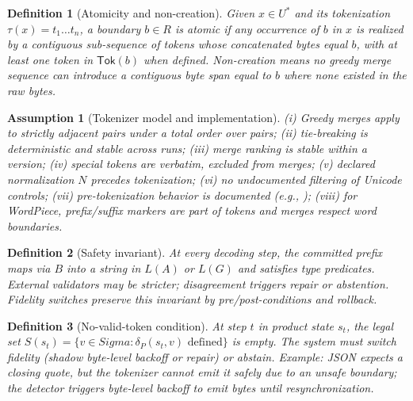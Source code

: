 \documentclass{article}
\def\Sigma{Sigma}%
\def\mathcal#1{#1}%
\newtheorem{assumption}{Assumption}
\newtheorem{definition}{Definition}
\begin{document}
\begin{definition}[Atomicity and non-creation]
Given $x\in\mathcal{U}^\ast$ and its tokenization $\tau(x)=t_1\dots t_n$, a boundary $b\in\mathcal{R}$ is atomic if any occurrence of $b$ in $x$ is realized by a contiguous sub-sequence of tokens whose concatenated bytes equal $b$, with at least one token in $\mathsf{Tok}(b)$ when defined. Non-creation means no greedy merge sequence can introduce a contiguous byte span equal to $b$ where none existed in the raw bytes.
\end{definition}

\begin{assumption}[Tokenizer model and implementation]\label{assump:tok}
(i) Greedy merges apply to strictly adjacent pairs under a total order over pairs; (ii) tie-breaking is deterministic and stable across runs; (iii) merge ranking is stable within a version; (iv) special tokens are verbatim, excluded from merges; (v) declared normalization $\mathcal{N}$ precedes tokenization; (vi) no undocumented filtering of Unicode controls; (vii) pre-tokenization behavior is documented (e.g., ); (viii) for WordPiece, prefix/suffix markers are part of tokens and merges respect word boundaries.
\end{assumption}

\begin{definition}[Safety invariant]
At every decoding step, the committed prefix maps via $\mathcal{B}$ into a string in $\mathcal{L}(\mathcal{A})$ or $\mathcal{L}(\mathcal{G})$ and satisfies type predicates. External validators may be stricter; disagreement triggers repair or abstention. Fidelity switches preserve this invariant by pre/post-conditions and rollback.
\end{definition}

\begin{definition}[No-valid-token condition]
At step $t$ in product state $s_t$, the legal set $\mathcal{S}(s_t)=\{v\in\Sigma:\delta_{\mathcal{P}}(s_t,v)\text{ defined}\}$ is empty. The system must switch fidelity (shadow byte-level backoff or repair) or abstain. Example: JSON expects a closing quote, but the tokenizer cannot emit it safely due to an unsafe boundary; the detector triggers byte-level backoff to emit bytes until resynchronization.
\end{definition}
\end{document}

